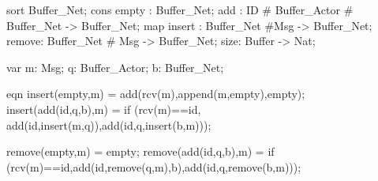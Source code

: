 sort Buffer_Net;
cons empty : Buffer_Net;
     add : ID # Buffer_Actor # Buffer_Net -> Buffer_Net;
map
    insert : Buffer_Net #Msg -> Buffer_Net;
    remove: Buffer_Net # Msg -> Buffer_Net;
    size: Buffer -> Nat;

var 
 m: Msg;
 q: Buffer_Actor;
 b: Buffer_Net;
 
eqn
   insert(empty,m) = add(rcv(m),append(m,empty),empty);
   insert(add(id,q,b),m) = 
    if (rcv(m)==id, add(id,insert(m,q)),add(id,q,insert(b,m)));
  
   remove(empty,m) = empty;
   remove(add(id,q,b),m) = 
      if (rcv(m)==id,add(id,remove(q,m),b),add(id,q,remove(b,m)));